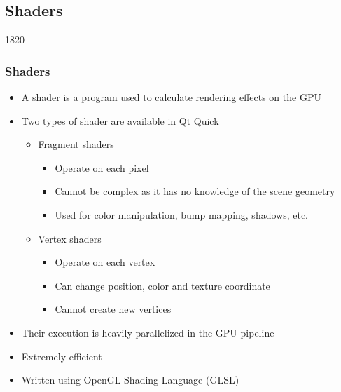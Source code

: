 %
%
%
%

\subsection{Shaders}


\begin{slide}{1820}\frametitle{Shaders}

\begin{itemize}
\item A shader is a program used to calculate rendering effects on the GPU
\vspace*{1em}
\item Two types of shader are available in Qt Quick
  \begin{itemize}
  \item Fragment shaders
    \begin{itemize}
    \item Operate on each pixel
    \item Cannot be complex as it has no knowledge of the scene geometry
    \item Used for color manipulation, bump mapping, shadows, etc.
    \end{itemize}
  \item Vertex shaders
    \begin{itemize}
    \item Operate on each vertex
    \item Can change position, color and texture coordinate
    \item Cannot create new vertices
    \end{itemize}
  \end{itemize}
\item Their execution is heavily parallelized in the GPU pipeline
\item Extremely efficient
\item Written using OpenGL Shading Language (GLSL)
\end{itemize}

\end{slide}

